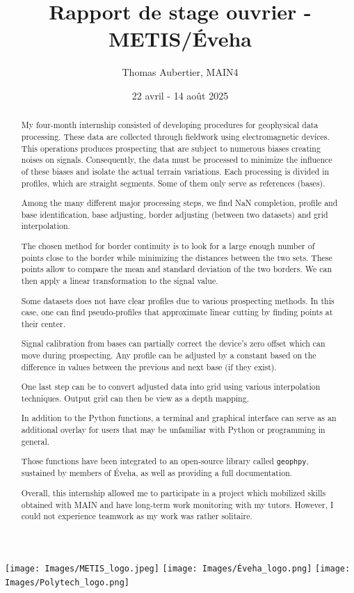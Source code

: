 \documentclass[12pt]{article}
\title{Rapport de stage ouvrier - METIS/Éveha}
\author{Thomas Aubertier, MAIN4}
\date{22 avril - 14 août 2025}
\begin{document}
\maketitle

\vskip 40pt
\texttt{[image: Images/METIS\_logo.jpeg]} 
\hfill
\texttt{[image: Images/Éveha\_logo.png]}
\vskip 40pt
\texttt{[image: Images/Polytech\_logo.png]}  

\newpage
\begin{abstract}
    My four-month internship consisted of developing procedures for geophysical data processing. These data are collected through fieldwork using electromagnetic devices. This operations produces prospecting that are subject to numerous biases creating noises on signals. Consequently, the data must be processed to minimize the influence of these biases and isolate the actual terrain variations. Each processing is divided in profiles, which are straight segments. Some of them only serve as references (bases).

    Among the many different major processing steps, we find NaN completion, profile and base identification, base adjusting, border adjusting (between two datasets) and grid interpolation.

    The chosen method for border continuity is to look for a large enough number of points close to the border while minimizing the distances between the two sets. These points allow to compare the mean and standard deviation of the two borders. We can then apply a linear transformation to the signal value.

    Some datasets does not have clear profiles due to various prospecting methods. In this case, one can find pseudo-profiles that approximate linear cutting by finding points at their center.

    Signal calibration from bases can partially correct the device's zero offset which can move during prospecting. Any profile can be adjusted by a constant based on the difference in values between the previous and next base (if they exist).

    One last step can be to convert adjusted data into grid using various interpolation techniques. Output grid can then be view as a depth mapping.

    In addition to the Python functions, a terminal and graphical interface can serve as an additional overlay for users that may be unfamiliar with Python or programming in general.

    Those functions have been integrated to an open-source library called \texttt{geophpy}, sustained by members of Éveha, as well as providing a full documentation.

    Overall, this internship allowed me to participate in a project which mobilized skills obtained with MAIN and have long-term work monitoring with my tutors. However, I could not experience teamwork as my work was rather solitaire.
\end{abstract}
\end{document}
